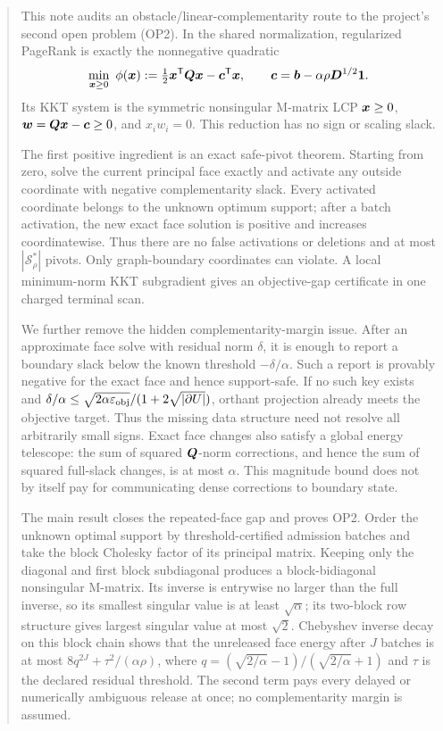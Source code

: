\maketitle

\begin{abstract}
This note audits an obstacle/linear-complementarity route to the project's
second open problem (OP2).  In the shared normalization, regularized
PageRank is exactly the nonnegative quadratic
\[
 \min_{\vx\geq0}\ \phi(\vx)
 :=\tfrac12\vx^\trans\mQ\vx-\vc^\trans\vx,
 \qquad
 \vc=\vb-\alpha\rho\mD^{1/2}\one .
\]
Its KKT system is the symmetric nonsingular M-matrix LCP
$\vx\geq0$, $\vw=\mQ\vx-\vc\geq0$, and
$x_iw_i=0$.  This reduction has no sign or scaling slack.

The first positive ingredient is an exact safe-pivot theorem.
Starting from zero, solve the current principal face exactly and activate any
outside coordinate with negative complementarity slack.  Every activated
coordinate belongs to the unknown optimum support; after a batch activation,
the new exact face solution is positive and increases coordinatewise.  Thus
there are no false activations or deletions and at most $|\mathcal S_\rho^*|$ pivots.
Only graph-boundary coordinates can violate.  A local minimum-norm KKT
subgradient gives an objective-gap certificate in one charged terminal scan.

We further remove the hidden complementarity-margin issue.  After an
approximate face solve with residual norm $\delta$, it is enough to report a
boundary slack below the known threshold $-\delta/\alpha$.  Such a report is
provably negative for the exact face and hence support-safe.  If no such key
exists and
$\delta/\alpha\leq\sqrt{2\alpha\epsobj}/(1+2\sqrt{|\partial U|})$,
orthant projection already meets the objective target.  Thus the missing data
structure need not resolve all arbitrarily small signs.
Exact face changes also satisfy a global energy telescope: the sum of squared
$\mQ$-norm corrections, and hence the sum of squared full-slack changes, is at
most $\alpha$.  This magnitude bound does not by itself pay for communicating
dense corrections to boundary state.

The main result closes the repeated-face gap and proves OP2.  Order the unknown
optimal support by threshold-certified admission batches and take the block
Cholesky factor of its principal matrix.  Keeping only the diagonal and first
block subdiagonal produces a block-bidiagonal nonsingular M-matrix.  Its inverse
is entrywise no larger than the full inverse, so its smallest singular value is
at least $\sqrt\alpha$; its two-block row structure gives largest singular value
at most $\sqrt2$.  Chebyshev inverse decay on this block chain shows that the
unreleased face energy after $J$ batches is at most
$8q^{2J}+\tau^2/(\alpha\rho)$, where
$q=(\sqrt{2/\alpha}-1)/(\sqrt{2/\alpha}+1)$ and $\tau$ is the declared residual
threshold.  The second term pays every delayed or numerically ambiguous release
at once; no complementarity margin is assumed.


\end{abstract}
